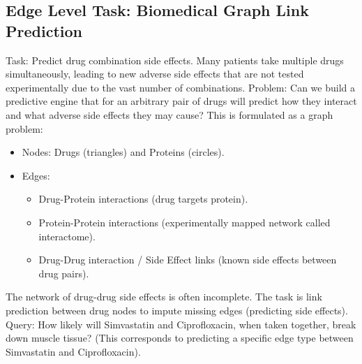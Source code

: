 \documentclass{article}
\begin{document}
\subsection{Edge Level Task: Biomedical Graph Link Prediction}
Task: Predict drug combination side effects. Many patients take multiple drugs simultaneously, leading to new adverse side effects that are not tested experimentally due to the vast number of combinations.
Problem: Can we build a predictive engine that for an arbitrary pair of drugs will predict how they interact and what adverse side effects they may cause?
This is formulated as a graph problem:
\begin{itemize}
    \item Nodes: Drugs (triangles) and Proteins (circles).
    \item Edges:
    \begin{itemize}
        \item Drug-Protein interactions (drug targets protein).
        \item Protein-Protein interactions (experimentally mapped network called interactome).
        \item Drug-Drug interaction / Side Effect links (known side effects between drug pairs).
    \end{itemize}
\end{itemize}
The network of drug-drug side effects is often incomplete. The task is link prediction between drug nodes to impute missing edges (predicting side effects).
Query: How likely will Simvastatin and Ciprofloxacin, when taken together, break down muscle tissue? (This corresponds to predicting a specific edge type between Simvastatin and Ciprofloxacin).
\end{document}
